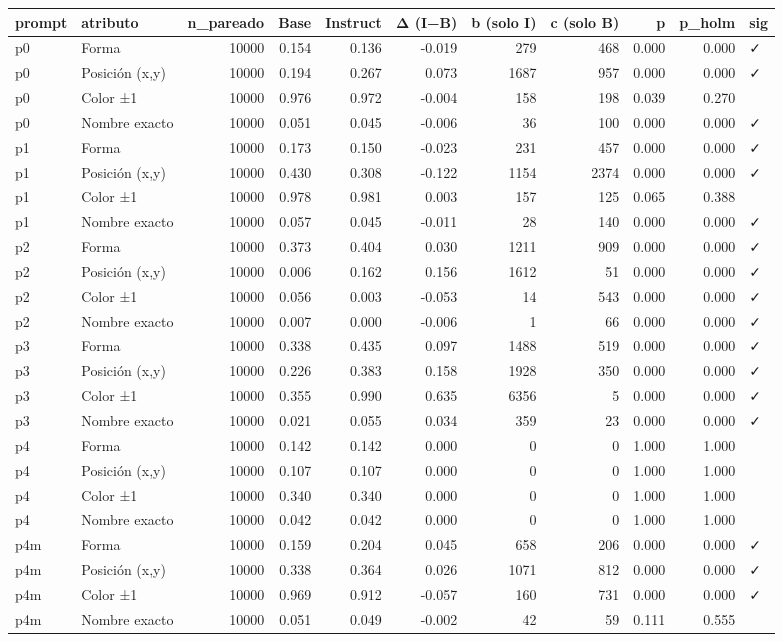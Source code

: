 \begin{tabular}{llrrrrrrrrl}
\toprule
prompt & atributo & n\_pareado & Base & Instruct & Δ (I−B) & b (solo I) & c (solo B) & p & p\_holm & sig \\
\midrule
p0 & Forma & 10000 & 0.154 & 0.136 & -0.019 & 279 & 468 & 0.000 & 0.000 & ✓ \\
p0 & Posición (x,y) & 10000 & 0.194 & 0.267 & 0.073 & 1687 & 957 & 0.000 & 0.000 & ✓ \\
p0 & Color ±1 & 10000 & 0.976 & 0.972 & -0.004 & 158 & 198 & 0.039 & 0.270 &  \\
p0 & Nombre exacto & 10000 & 0.051 & 0.045 & -0.006 & 36 & 100 & 0.000 & 0.000 & ✓ \\
p1 & Forma & 10000 & 0.173 & 0.150 & -0.023 & 231 & 457 & 0.000 & 0.000 & ✓ \\
p1 & Posición (x,y) & 10000 & 0.430 & 0.308 & -0.122 & 1154 & 2374 & 0.000 & 0.000 & ✓ \\
p1 & Color ±1 & 10000 & 0.978 & 0.981 & 0.003 & 157 & 125 & 0.065 & 0.388 &  \\
p1 & Nombre exacto & 10000 & 0.057 & 0.045 & -0.011 & 28 & 140 & 0.000 & 0.000 & ✓ \\
p2 & Forma & 10000 & 0.373 & 0.404 & 0.030 & 1211 & 909 & 0.000 & 0.000 & ✓ \\
p2 & Posición (x,y) & 10000 & 0.006 & 0.162 & 0.156 & 1612 & 51 & 0.000 & 0.000 & ✓ \\
p2 & Color ±1 & 10000 & 0.056 & 0.003 & -0.053 & 14 & 543 & 0.000 & 0.000 & ✓ \\
p2 & Nombre exacto & 10000 & 0.007 & 0.000 & -0.006 & 1 & 66 & 0.000 & 0.000 & ✓ \\
p3 & Forma & 10000 & 0.338 & 0.435 & 0.097 & 1488 & 519 & 0.000 & 0.000 & ✓ \\
p3 & Posición (x,y) & 10000 & 0.226 & 0.383 & 0.158 & 1928 & 350 & 0.000 & 0.000 & ✓ \\
p3 & Color ±1 & 10000 & 0.355 & 0.990 & 0.635 & 6356 & 5 & 0.000 & 0.000 & ✓ \\
p3 & Nombre exacto & 10000 & 0.021 & 0.055 & 0.034 & 359 & 23 & 0.000 & 0.000 & ✓ \\
p4 & Forma & 10000 & 0.142 & 0.142 & 0.000 & 0 & 0 & 1.000 & 1.000 &  \\
p4 & Posición (x,y) & 10000 & 0.107 & 0.107 & 0.000 & 0 & 0 & 1.000 & 1.000 &  \\
p4 & Color ±1 & 10000 & 0.340 & 0.340 & 0.000 & 0 & 0 & 1.000 & 1.000 &  \\
p4 & Nombre exacto & 10000 & 0.042 & 0.042 & 0.000 & 0 & 0 & 1.000 & 1.000 &  \\
p4m & Forma & 10000 & 0.159 & 0.204 & 0.045 & 658 & 206 & 0.000 & 0.000 & ✓ \\
p4m & Posición (x,y) & 10000 & 0.338 & 0.364 & 0.026 & 1071 & 812 & 0.000 & 0.000 & ✓ \\
p4m & Color ±1 & 10000 & 0.969 & 0.912 & -0.057 & 160 & 731 & 0.000 & 0.000 & ✓ \\
p4m & Nombre exacto & 10000 & 0.051 & 0.049 & -0.002 & 42 & 59 & 0.111 & 0.555 &  \\
\bottomrule
\end{tabular}
